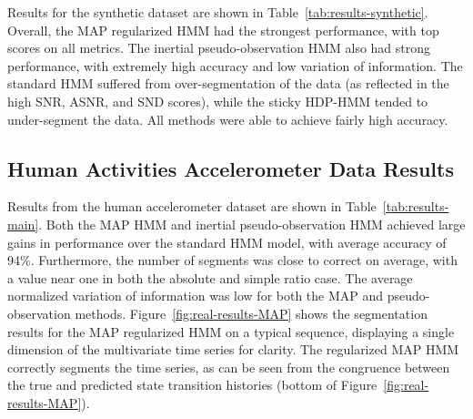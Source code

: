 \documentclass[letterpaper]{article}
\begin{document}
Results for the synthetic dataset are shown in
Table~\ref{tab:results-synthetic}. Overall, the MAP regularized HMM had the
strongest performance, with top scores on all metrics. The inertial
pseudo-observation HMM also had strong performance, with extremely high accuracy
and low variation of information. The standard HMM suffered from
over-segmentation of the data (as reflected in the high SNR, ASNR, and SND
scores), while the sticky HDP-HMM tended to under-segment the data. All methods
were able to achieve fairly high accuracy.
\vspace{-0.1cm}
\subsection{Human Activities Accelerometer Data Results}\label{sec:quantitative}
\vspace{-0.5cm}
\begin{table}[htbp]
\caption{Results from quantitative evaluation on multivariate human accelerometer data.}
\label{tab:results-main}
\end{table}
\vspace{-0.1cm}

Results from the human accelerometer dataset are shown in
Table~\ref{tab:results-main}. Both the MAP HMM and inertial pseudo-observation
HMM achieved large gains in performance over the standard HMM model, with
average accuracy of 94\%. Furthermore, the number of segments was close to
correct on average, with a value near one in both the absolute and simple ratio
case. The average normalized variation of information was low for both the MAP and pseudo-observation methods.
Figure~\ref{fig:real-results-MAP} shows the segmentation results for the MAP
regularized HMM on a typical sequence, displaying a single dimension of the
multivariate time series for clarity. The regularized MAP HMM correctly segments
the time series, as can be seen from the congruence between the true and
predicted state transition histories (bottom of Figure~\ref{fig:real-results-MAP}).
\end{document}
